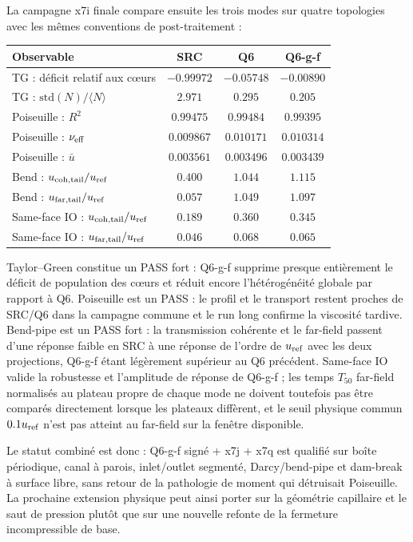 \documentclass[11pt,a4paper]{article}
\begin{document}
La campagne x7i finale compare ensuite les trois modes sur quatre topologies avec les mêmes conventions de post-traitement :
\begin{center}
\begin{tabular}{@{}lccc@{}}
\toprule
Observable & SRC & Q6 & Q6-g-f \\
\midrule
TG : déficit relatif aux c\oe urs & $-0.99972$ & $-0.05748$ & $-0.00890$ \\
TG : $\mathrm{std}(N)/\langle N\rangle$ & $2.971$ & $0.295$ & $0.205$ \\
Poiseuille : $R^2$ & $0.99475$ & $0.99484$ & $0.99395$ \\
Poiseuille : $\nu_{\rm eff}$ & $0.009867$ & $0.010171$ & $0.010314$ \\
Poiseuille : $\bar u$ & $0.003561$ & $0.003496$ & $0.003439$ \\
Bend : $u_{\rm coh,tail}/u_{\rm ref}$ & $0.400$ & $1.044$ & $1.115$ \\
Bend : $u_{\rm far,tail}/u_{\rm ref}$ & $0.057$ & $1.049$ & $1.097$ \\
Same-face IO : $u_{\rm coh,tail}/u_{\rm ref}$ & $0.189$ & $0.360$ & $0.345$ \\
Same-face IO : $u_{\rm far,tail}/u_{\rm ref}$ & $0.046$ & $0.068$ & $0.065$ \\
\bottomrule
\end{tabular}
\end{center}

Taylor--Green constitue un PASS fort : Q6-g-f supprime presque entièrement le déficit de population des c\oe urs et réduit encore l'hétérogénéité globale par rapport à Q6. Poiseuille est un PASS : le profil et le transport restent proches de SRC/Q6 dans la campagne commune et le run long confirme la viscosité tardive. Bend-pipe est un PASS fort : la transmission cohérente et le far-field passent d'une réponse faible en SRC à une réponse de l'ordre de $u_{\rm ref}$ avec les deux projections, Q6-g-f étant légèrement supérieur au Q6 précédent. Same-face IO valide la robustesse et l'amplitude de réponse de Q6-g-f ; les temps $T_{50}$ far-field normalisés au plateau propre de chaque mode ne doivent toutefois pas être comparés directement lorsque les plateaux diffèrent, et le seuil physique commun $0.1u_{\rm ref}$ n'est pas atteint au far-field sur la fenêtre disponible.

Le statut combiné est donc : Q6-g-f signé + x7j + x7q est qualifié sur boîte périodique, canal à parois, inlet/outlet segmenté, Darcy/bend-pipe et dam-break à surface libre, sans retour de la pathologie de moment qui détruisait Poiseuille. La prochaine extension physique peut ainsi porter sur la géométrie capillaire et le saut de pression plutôt que sur une nouvelle refonte de la fermeture incompressible de base.
\end{document}
